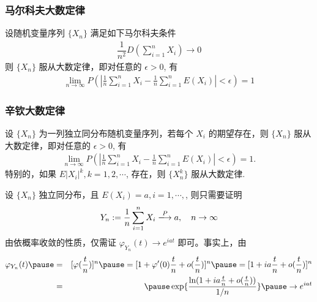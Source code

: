 \documentclass[Prob-All.tex]{subfiles}
\begin{document}
\begin{frame}
	\frametitle{马尔科夫大数定律}
	\begin{thm}
		设随机变量序列 $\{X_n\}$ 满足如下马尔科夫条件
		\begin{eqnarray*}
			\dfrac{1}{n^2}D(\sum_{i=1}^nX_i)\rightarrow 0
		\end{eqnarray*}
		则 $\{X_n\}$ 服从大数定律，即对任意的 $\epsilon>0$, 有
		\begin{eqnarray*}
			\lim_{n\rightarrow\infty}P(|\frac{1}{n}\sum_{i=1}^nX_i-\frac{1}{n}\sum_{i=1}^nE(X_i)|<\epsilon)=1
		\end{eqnarray*}
	\end{thm}
\end{frame}
\begin{frame}
	\frametitle{辛钦大数定律}
	\begin{thm}
		设 $\{X_n\}$ 为一列独立同分布随机变量序列，若每个 $X_i$ 的期望存在，则 $\{X_n\}$ 服从大数定律，即对任意的 $\epsilon>0$, 有
		\begin{eqnarray*}
			\lim_{n\rightarrow\infty}P(|\frac{1}{n}\sum_{i=1}^nX_i-\frac{1}{n}\sum_{i=1}^nE(X_i)|<\epsilon)=1.
		\end{eqnarray*}
		特别的，如果 $E|X_i|^k, k=1,2,\cdots$, 存在，则 $\{X_n^k\}$ 服从大数定律.
	\end{thm}

	\pause%
	\zheng 设 $\{X_n\}$ 独立同分布，且 $E (X_i)=a, i=1,\cdots,$, 则只需要证明
	\begin{eqnarray*}
		Y_n:=\dfrac{1}{n}\sum_{i=1}^nX_i\xlongrightarrow{P}a, \quad n\rightarrow \infty
	\end{eqnarray*}
	\pause 由依概率收敛的性质，仅需证 $\varphi_{Y_n}(t)\rightarrow e^{iat}$ 即可。事实上，由
	\pause \begin{eqnarray*}
		\varphi_{Y_n}(t)\pause &=&[\varphi(\frac{t}{n})]^n\pause =[1+\varphi'(0)\frac{t}{n}+o(\frac{t}{n})]^n\pause =[1+ia\frac{t}{n}+o(\frac{t}{n})]^n\\
		&=&\pause \exp\{\dfrac{\ln (1+ia\frac{t}{n}+o(\frac{t}{n}))}{1/n}\}\pause \rightarrow e^{iat}
	\end{eqnarray*}

\end{frame}
\end{document}
